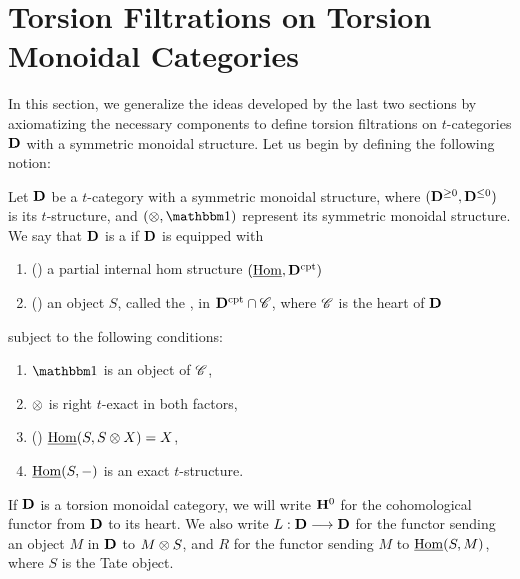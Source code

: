 \newpage
\section{Torsion Filtrations on Torsion Monoidal Categories}
\label{sect_filtration_general}

In this section, we generalize the ideas developed by the last
two sections by axiomatizing the necessary components to define
torsion filtrations on $t$-categories $\mathbf{D}$ with a symmetric
monoidal structure. Let us begin by defining the following notion:

\begin{defn}\label{def_torsion_monoidal_category}
Let $\mathbf{D}$ be a $t$-category with a symmetric monoidal structure,
where $(\mathbf{D}^{\geq 0}, \mathbf{D}^{\leq 0})$ is its $t$-structure,
and $(\tensor, \Unit)$ represent its symmetric monoidal structure.
We say that $\mathbf{D}$ is a  if $\mathbf{D}$
is equipped with 
\begin{enumerate}
\item () a partial internal hom
structure $(\underline{\mathrm{Hom}}, \mathbf{D}^{\mathrm{cpt}})$

\item () an object $S$, called the 
   , in $\mathbf{D}^{\mathrm{cpt}} \cap \mathscr{C}$, where 
   $\mathscr{C}$ is the heart of $\mathbf{D}$
\end{enumerate}

\noindent subject to the following conditions:

\begin{enumerate}
\item $\Unit$ is an object of $\mathscr{C}$,

\item $\otimes$ is right $t$-exact in both factors,

\item () $\underline{\mathrm{Hom}}(S, S \otimes X) = X$,

\item $\underline{\mathrm{Hom}}(S, -)$ is an exact $t$-structure.
\end{enumerate}
\end{defn}

If $\mathbf{D}$ is a torsion monoidal category, we will write $\mathbf{H}^0$
for the cohomological functor from $\mathbf{D}$ to its heart. We also 
write $L: \mathbf{D} \longrightarrow \mathbf{D}$ for the functor sending an object $M$ 
in $\mathbf{D}$ to $M \otimes S$, and $R$ for the functor sending $M$
to $\underline{\mathrm{Hom}}(S, M)$, where $S$ is the Tate object. 

